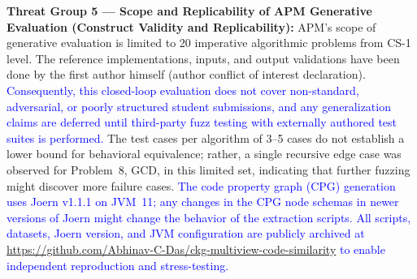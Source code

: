 \textbf{Threat Group 5 --- Scope and Replicability of APM Generative Evaluation (Construct Validity and Replicability):}
APM’s scope of generative evaluation is limited to 20 imperative algorithmic problems from CS-1 level. The reference implementations, inputs, and output validations have been done by the first author himself (author conflict of interest declaration). \textcolor{blue}{Consequently, this closed-loop evaluation does not cover non-standard, adversarial, or poorly structured student submissions, and any generalization claims are deferred until third-party fuzz testing with externally authored test suites is performed.} The test cases per algorithm of 3--5 cases do not establish a lower bound for behavioral equivalence; rather, a single recursive edge case was observed for Problem~8, GCD, in this limited set, indicating that further fuzzing might discover more failure cases. \textcolor{blue}{The code property graph (CPG) generation uses Joern v1.1.1 on JVM~11; any changes in the CPG node schemas in newer versions of Joern might change the behavior of the extraction scripts. All scripts, datasets, Joern version, and JVM configuration are publicly archived at \url{https://github.com/Abhinav-C-Das/ckg-multiview-code-similarity} to enable independent reproduction and stress-testing.}
